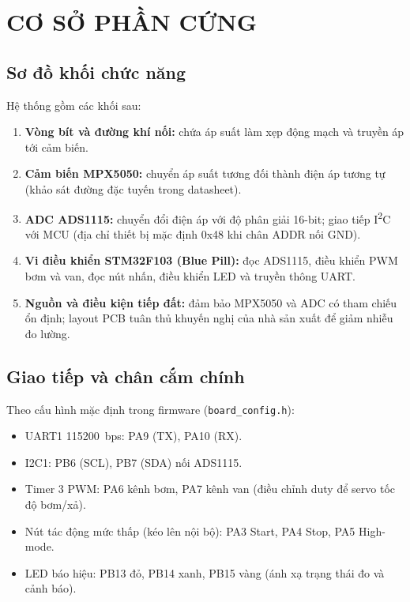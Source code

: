 \pagestyle{fancy}
\chapter{CƠ SỞ PHẦN CỨNG}

\section{Sơ đồ khối chức năng}
Hệ thống gồm các khối sau:
\begin{enumerate}\itemsep0pt
	\item \textbf{Vòng bít và đường khí nối:} chứa áp suất làm xẹp động mạch và truyền áp tới cảm biến.
	\item \textbf{Cảm biến MPX5050:} chuyển áp suất tương đối thành điện áp tương tự (khảo sát đường đặc tuyến trong datasheet).
	\item \textbf{ADC ADS1115:} chuyển đổi điện áp với độ phân giải 16-bit; giao tiếp I\textsuperscript{2}C với MCU (địa chỉ thiết bị mặc định 0x48 khi chân ADDR nối GND).
	\item \textbf{Vi điều khiển STM32F103 (Blue Pill):} đọc ADS1115, điều khiển PWM bơm và van, đọc nút nhấn, điều khiển LED và truyền thông UART.
	\item \textbf{Nguồn và điều kiện tiếp đất:} đảm bảo MPX5050 và ADC có tham chiếu ổn định; layout PCB tuân thủ khuyến nghị của nhà sản xuất để giảm nhiễu đo lường.
\end{enumerate}

\section{Giao tiếp và chân cắm chính}
Theo cấu hình mặc định trong firmware (\texttt{board\_config.h}):
\begin{itemize}\itemsep0pt
	\item UART1 115200~bps: PA9 (TX), PA10 (RX).
	\item I2C1: PB6 (SCL), PB7 (SDA) nối ADS1115.
	\item Timer 3 PWM: PA6 kênh bơm, PA7 kênh van (điều chỉnh duty để servo tốc độ bơm/xả).
	\item Nút tác động mức thấp (kéo lên nội bộ): PA3 Start, PA4 Stop, PA5 High-mode.
	\item LED báo hiệu: PB13 đỏ, PB14 xanh, PB15 vàng (ánh xạ trạng thái đo và cảnh báo).
\end{itemize}

